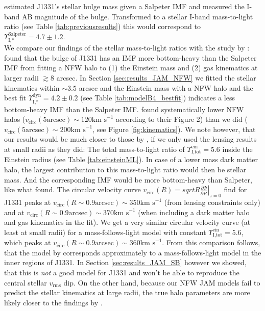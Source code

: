 \citet{SWELLSI} estimated J1331's stellar bulge mass given a Salpeter IMF and measured the I-band AB magnitude of the bulge. Transformed to a stellar I-band mass-to-light ratio (see Table \ref{tab:previousresults}) this would correspond to $\Upsilon_\text{I,*}^\text{Salpeter} = 4.7 \pm 1.2$.\\

We compare our findings of the stellar mass-to-light ratios with the study by \cite{SWELLSV}: \cite{SWELLSV} found that the bulge of J1331 has an IMF more bottom-heavy than the Salpeter IMF from fitting a NFW halo to (1) the Einstein mass and (2) gas kinematics at larger radii $\gtrsim 8$ arcsec. In Section \ref{sec:results_JAM_NFW} we fitted the stellar kinematics within $\sim 3.5$ arcsec and the Einstein mass with a NFW halo and the best fit $\Upsilon_\text{I,*}^\text{dyn} = 4.2 \pm 0.2$ (see Table \ref{tab:modelB4_bestfit}) indicates a less bottom-heavy IMF than the Salpeter IMF. \cite{SWELLSV}  found systematically lower NFW halos ($v_\text{circ}(5\text{arcsec}) \sim 120 \text{km s}^{-1}$ according to their Figure 2) than we did ($v_\text{circ}(5\text{arcsec}) \sim 200 \text{km s}^{-1}$, see Figure \ref{fig:kinematics}). We note however, that our results would be much closer to those by \citet{SWELLSV}, if we only used the lensing results at small radii as they did: The total mass-to-light ratio of $\Upsilon_\text{I,tot}^\text{ein} = 5.6$ inside the Einstein radius (see Table \ref{tab:einsteinML}). In case of a lower mass dark matter halo, the largest contribution to this mass-to-light ratio would then be stellar mass. And the corresponding IMF would be more bottom-heavy than Salpeter,  like what \citet{SWELLSV} found. The circular velocity curve $v_\text{circ}(R) = \left. sqrt{R \frac{\partial \Phi}{\partial R}} \right|_{z=0}$ \citet{SWELLSV} find for J1331 peaks at $v_\text{circ}(R\sim0.9 \text{arcsec}) \sim 350 \text{km s}^{-1}$ (from lensing constraints only) and at $v_\text{circ}(R\sim0.9 \text{arcsec}) \sim 370 \text{km s}^{-1}$ (when including a dark matter halo and gas kinematics in the fit). We get a very similar circular velocity curve (at least at small radii) for a mass-follows-light model with constant $\Upsilon_\text{I,tot}^\text{ein} = 5.6$, which peaks at $v_\text{circ}(R\sim0.9 \text{arcsec}) \sim 360 \text{km s}^{-1}$. From this comparison follows, that the model by \citet{SWELLS} corresponds approximately to a mass-follows-light model in the inner regions of J1331. In Section \ref{sec:results_JAM_SB} however we showed, that this is \emph{not} a good model for J1331 and won't be able to reproduce the central stellar $v_\text{rms}$ dip. On the other hand, because our NFW JAM models fail to predict the stellar kinematics at large radii, the true halo parameters are more likely closer to the findings by \citet{SWELLSV}.\\

